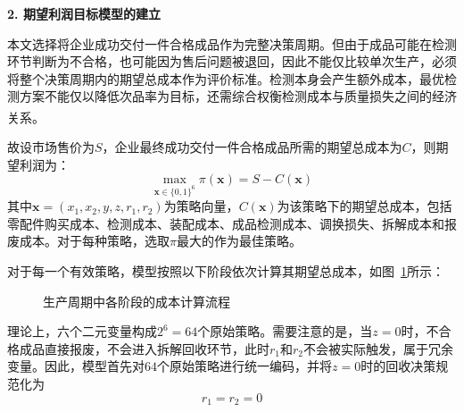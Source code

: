 \documentclass[withoutpreface,bwprint]{cumcmthesis}
\numberwithin{equation}{section}
\begin{document}
\textbf{2. 期望利润目标模型的建立}

本文选择将企业成功交付一件合格成品作为完整决策周期。但由于成品可能在检测环节判断为不合格，也可能因为售后问题被退回，因此不能仅比较单次生产，必须将整个决策周期内的期望总成本作为评价标准。检测本身会产生额外成本，最优检测方案不能仅以降低次品率为目标，还需综合权衡检测成本与质量损失之间的经济关系\textsuperscript{\cite{xue2020}}。

故设市场售价为$S$，企业最终成功交付一件合格成品所需的期望总成本为$C$，则期望利润为：
\begin{equation}
\max_{\boldsymbol{x}\in\{0,1\}^6} \pi(\boldsymbol{x}) = S - C(\boldsymbol{x})
\end{equation}
其中$\boldsymbol{x}=(x_1,x_2,y,z,r_1,r_2)$为策略向量，$C(\boldsymbol{x})$为该策略下的期望总成本，包括零配件购买成本、检测成本、装配成本、成品检测成本、调换损失、拆解成本和报废成本。对于每种策略，选取$\pi$最大的作为最佳策略。

对于每一个有效策略，模型按照以下阶段依次计算其期望总成本，如图~\ref{fig:cost-flow}所示：
\begin{figure}[H]
    \centering
    \caption{生产周期中各阶段的成本计算流程}
    \label{fig:cost-flow}
\end{figure}

理论上，六个二元变量构成$2^6=64$个原始策略。需要注意的是，当$z=0$时，不合格成品直接报废，不会进入拆解回收环节，此时$r_1$和$r_2$不会被实际触发，属于冗余变量。因此，模型首先对$64$个原始策略进行统一编码，并将$z=0$时的回收决策规范化为
\begin{equation}
r_1=r_2=0
\end{equation}
\end{document}
